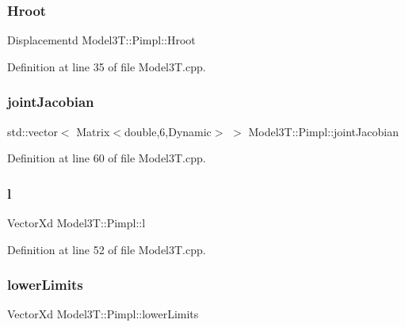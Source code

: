 \hypertarget{structModel3T_1_1Pimpl_a02c47a2c2920e1ddfce6457502061f0b}{}\label{structModel3T_1_1Pimpl_a02c47a2c2920e1ddfce6457502061f0b} 
\subsubsection{\texorpdfstring{Hroot}{Hroot}}
{\footnotesize\ttfamily Displacementd Model3\+T\+::\+Pimpl\+::\+Hroot}



Definition at line 35 of file Model3\+T.\+cpp.

\hypertarget{structModel3T_1_1Pimpl_a8dbebd103170b8f5b8aa5ce4dd383696}{}\label{structModel3T_1_1Pimpl_a8dbebd103170b8f5b8aa5ce4dd383696} 
\subsubsection{\texorpdfstring{joint\+Jacobian}{jointJacobian}}
{\footnotesize\ttfamily std\+::vector$<$ Matrix$<$double,6,Dynamic$>$ $>$ Model3\+T\+::\+Pimpl\+::joint\+Jacobian}



Definition at line 60 of file Model3\+T.\+cpp.

\hypertarget{structModel3T_1_1Pimpl_a7fcae8ba57e320a9066aa9b640f414cb}{}\label{structModel3T_1_1Pimpl_a7fcae8ba57e320a9066aa9b640f414cb} 
\subsubsection{\texorpdfstring{l}{l}}
{\footnotesize\ttfamily Vector\+Xd Model3\+T\+::\+Pimpl\+::l}



Definition at line 52 of file Model3\+T.\+cpp.

\hypertarget{structModel3T_1_1Pimpl_a635ed979bb210444627f06eb65db8f29}{}\label{structModel3T_1_1Pimpl_a635ed979bb210444627f06eb65db8f29} 
\subsubsection{\texorpdfstring{lower\+Limits}{lowerLimits}}
{\footnotesize\ttfamily Vector\+Xd Model3\+T\+::\+Pimpl\+::lower\+Limits}



